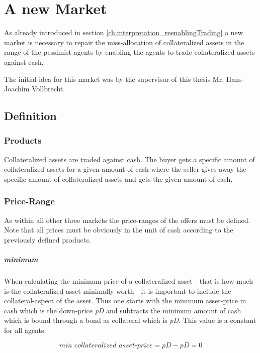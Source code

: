 \documentclass[Bachelorarbeit.tex]{subfiles}
\begin{document}
\graphicspath{{./figures/newMarket/}}	%

\chapter{A new Market}
\label{ch:newMarket}
As already introduced in section \ref{ch:interpretation_reenablingTrading} a new market is necessary to repair the miss-allocation of collateralized assets in the range of the pessimist agents by enabling the agents to trade collateralized assets against cash.

\medskip

The initial idea for this market was by the supervisor of this thesis Mr. Hans-Joachim Vollbrecht.

\section{Definition}
\subsection{Products}
Collateralized assets are traded against cash. The buyer gets a specific amount of collateralized assets for a given amount of cash where the seller gives away the specific amount of collateralized assets and gets the given amount of cash.

\subsection{Price-Range}
As within all other three markets the price-ranges of the offers must be defined. Note that all prices must be obviously in the unit of cash according to the previously defined products.

\paragraph{minimum}
When calculating the minimum price of a collateralized asset - that is how much is the collateralized asset minimally worth - it is important to include the collateral-aspect of the asset. Thus one starts with the minimum asset-price in cash which is the down-price \textit{pD} and subtracts the minimum amount of cash which is bound through a bond as collateral which is \textit{pD}. This value is a constant for all agents.

\begin{equation}
\textit{min collateralized asset-price} = \textit{pD} - \textit{pD} = 0
\end{equation}
 
\end{document}
